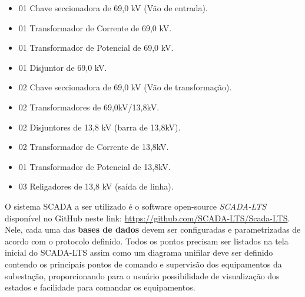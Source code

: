\documentclass[12pt]{article}
\providecommand{\tightlist}{%
  \setlength{\itemsep}{0pt}\setlength{\parskip}{0pt}}
\begin{document}
\begin{itemize}
\tightlist
\item 01 Chave seccionadora de 69,0 kV (Vão de entrada).
\item 01 Transformador de Corrente de 69,0 kV.
\item 01 Transformador de Potencial de 69,0 kV.
\item 01 Disjuntor de 69,0 kV.
\item 02 Chave seccionadora de 69,0 kV (Vão de transformação).
\item 02 Transformadores de 69,0kV/13,8kV.
\item 02 Disjuntores de 13,8 kV (barra de 13,8kV).
\item 02 Transformador de Corrente de 13,8kV.
\item 01 Transformador de Potencial de 13,8kV.
\item 03 Religadores de 13,8 kV (saída de linha).
\end{itemize}

O sistema SCADA a ser utilizado é o software open-source \emph{SCADA-LTS} disponível no GitHub neste link: \url{https://github.com/SCADA-LTS/Scada-LTS}. Nele, cada uma das \textbf{bases de dados} devem ser configuradas e parametrizadas de acordo com o protocolo definido. Todos os pontos precisam ser listados na tela inicial do SCADA-LTS assim como um diagrama unifilar deve ser definido contendo os principais pontos de comando e supervisão dos equipamentos da subestação, proporcionando para o usuário possibilidade de visualização dos estados e facilidade para comandar os equipamentos.
\end{document}
